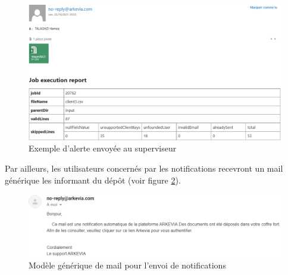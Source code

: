 \begin{figure}[H]
    \includegraphics[width=\linewidth]{images/sec5/monitoring_mail.png}
    \caption{Exemple d'alerte envoyée au superviseur}
    \label{fig:monitoring_mail}
\end{figure}
Par ailleurs, les utilisateurs concernés par les notifications recevront un mail générique les informant du dépôt (voir figure \ref{fig:notification_mail}).
\begin{figure}[H]
    \includegraphics[width=0.95\linewidth]{images/sec5/notification_mail.png}
    \caption{Modèle générique de mail pour l'envoi de notifications}
    \label{fig:notification_mail}
\end{figure}
